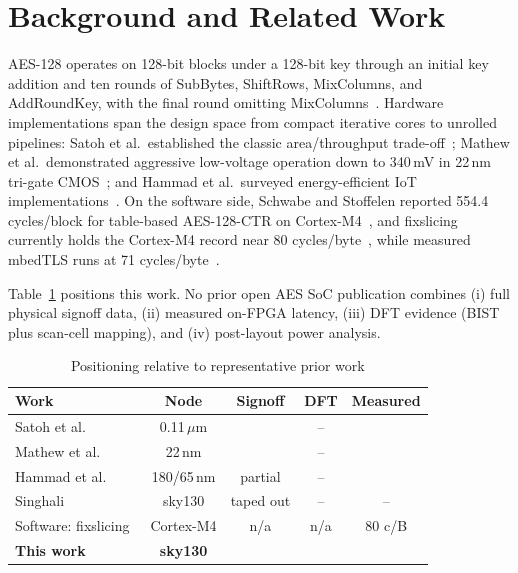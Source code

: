 \documentclass[conference]{IEEEtran}
\begin{document}
\section{Background and Related Work}
AES-128 operates on 128-bit blocks under a 128-bit key through an initial
key addition and ten rounds of SubBytes, ShiftRows, MixColumns, and
AddRoundKey, with the final round omitting MixColumns~\cite{fips197,sp80038a}.
Hardware implementations span the design space from compact iterative cores
to unrolled pipelines: Satoh et al.\ established the classic area/throughput
trade-off~\cite{satoh01}; Mathew et al.\ demonstrated aggressive
low-voltage operation down to 340\,mV in 22\,nm tri-gate
CMOS~\cite{mathew15}; and Hammad et al.\
surveyed energy-efficient IoT implementations~\cite{hammad20}. On the
software side, Schwabe and Stoffelen reported 554.4 cycles/block for
table-based AES-128-CTR on Cortex-M4~\cite{schwabe17}, and fixslicing
currently holds the Cortex-M4 record near 80 cycles/byte~\cite{kimseo25},
while measured mbedTLS runs at 71 cycles/byte~\cite{mbedtlsbench}.

Table~\ref{tab:related} positions this work. No prior open AES SoC
publication combines (i) full physical signoff data, (ii) measured on-FPGA
latency, (iii) DFT evidence (BIST plus scan-cell mapping), and (iv)
post-layout power analysis.

\begin{table}[htbp]
\caption{Positioning relative to representative prior work}
\label{tab:related}
\centering
\footnotesize
\setlength{\tabcolsep}{3.5pt}
\begin{tabular}{lcccc}
\toprule
Work & Node & Signoff & DFT & Measured \\
\midrule
Satoh et al.~\cite{satoh01} & 0.11\,$\mu$m & \checkmark & -- & \checkmark \\
Mathew et al.~\cite{mathew15} & 22\,nm & \checkmark & -- & \checkmark \\
Hammad et al.~\cite{hammad20} & 180/65\,nm & partial & -- & \checkmark \\
Singhali~\cite{singhali} & sky130 & taped out & -- & -- \\
Software: fixslicing~\cite{kimseo25} & Cortex-M4 & n/a & n/a & 80 c/B \\
\textbf{This work} & \textbf{sky130} & \textbf{\checkmark} & \textbf{\checkmark} & \textbf{\checkmark} \\
\bottomrule
\end{tabular}
\end{table}
\end{document}
